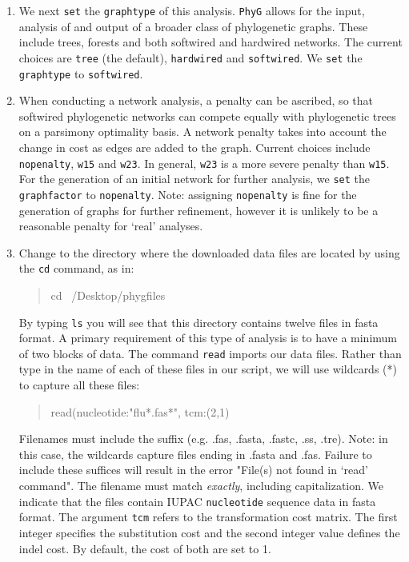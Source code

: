 \documentclass[11pt]{article}
\newcommand{\phyg}{\texttt{PhyG} }
\begin{document}
\begin{enumerate}
\item We next \texttt{set} the \texttt{graphtype} of this analysis. \phyg allows for 
the input, analysis of and output of a broader class of phylogenetic graphs. These
include trees, forests and both softwired and hardwired networks. The current choices 
are \texttt{tree} (the default), \texttt{hardwired} and \texttt{softwired}. We \texttt{set} 
the \texttt{graphtype} to \texttt{softwired}.

\item When conducting a network analysis, a penalty can be ascribed, so that 
softwired phylogenetic networks can compete equally with phylogenetic trees on 
a parsimony optimality basis. A network penalty takes into account the change in 
cost as edges are added to the graph. Current choices include \texttt{nopenalty}, 
\texttt{w15} and \texttt{w23}. In general, \texttt{w23} is a more severe penalty than
\texttt{w15}. For the generation of an initial network for further analysis, we 
\texttt{set} the \texttt{graphfactor} to \texttt{nopenalty}. Note: assigning \texttt{nopenalty}
is fine for the generation of graphs for further refinement, however it is unlikely 
to be a reasonable penalty for `real' analyses.

\item Change to the directory where the downloaded data files are located by using the 
\texttt{cd} command, as in:
		
	\begin{quote}
	cd ~/Desktop/phygfiles
	\end{quote}

By typing \texttt{ls} you will see that this directory contains twelve files in fasta format.
A primary requirement of this type of analysis is to have a minimum of two blocks of 
data. The command \texttt{read} imports our data files. Rather than type in the name 
of each of these files in our script, we will use wildcards (*) to capture all these files: 
        
        \begin{quote}
	read(nucleotide:"flu*.fas*", tcm:(2,1)\\
	\end{quote}

Filenames must include the suffix (e.g. .fas, .fasta, .fastc, .ss, .tre). Note: in this case, 
the wildcards capture files ending in .fasta and .fas. Failure to include these suffices 
will result in the error "File(s) not found in `read' command". The filename must match 
\textit{exactly}, including capitalization. We indicate that the files contain IUPAC 
\texttt{nucleotide} sequence data in fasta format. The argument \texttt{tcm} refers to 
the transformation cost matrix. The first integer specifies the substitution cost and the 
second integer value defines the indel cost. By default, the cost of both are set to 1.


\end{enumerate}
\end{document}
